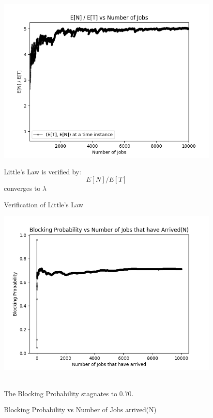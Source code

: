 \documentclass{beamer}
\begin{document}
\begin{frame}
\begin{figure}
    \centering
    \includegraphics[width=0.75\linewidth]{images/littles_law_verification.png}
    \caption{Verification of Little's Law}
    \label{E[N]/E[T] vs N}
Little's Law is verified by:
$$ E[N]/E[T]$$
converges to $\lambda$ \\
\end{figure}

\end{frame}
\begin{figure}
    \centering
    \includegraphics[width=0.75\linewidth]{images/blocking_probability.png}
    \caption{Blocking Probability vs Number of Jobs arrived(N)}
    \label{Blocking Probability vs N}
\\
The Blocking Probability stagnates to 0.70.
\end{figure}
\end{document}
